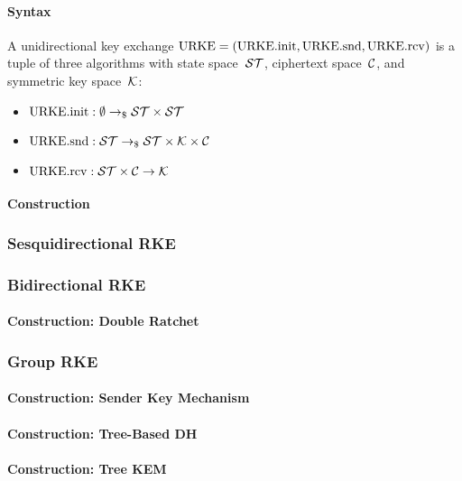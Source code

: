 \documentclass[a4paper,orivec]{llncs}
\begin{document}
\paragraph{Syntax}
A unidirectional key exchange $\mathrm{URKE}=(\mathrm{URKE}.\mathrm{init},\mathrm{URKE}.\mathrm{snd},\mathrm{URKE}.\mathrm{rcv})$ is a tuple of three algorithms with state space~$\mathcal{ST}$, ciphertext space~$\mathcal{C}$, and symmetric key space~$\mathcal{K}$:

\begin{itemize}
    \item $\mathrm{URKE}.\mathrm{init}: \emptyset \to_\$ \mathcal{ST}\times\mathcal{ST}$
    \item $\mathrm{URKE}.\mathrm{snd}: \mathcal{ST} \to_\$ \mathcal{ST}\times\mathcal{K}\times\mathcal{C}$
    \item $\mathrm{URKE}.\mathrm{rcv}: \mathcal{ST}\times\mathcal{C} \to \mathcal{K}$
\end{itemize}

\paragraph{Construction}

\subsubsection{Sesquidirectional RKE}

\subsubsection{Bidirectional RKE}

\paragraph{Construction: Double Ratchet}

\subsubsection{Group RKE}

\paragraph{Construction: Sender Key Mechanism}

\paragraph{Construction: Tree-Based DH}

\paragraph{Construction: Tree KEM}


\end{document}
